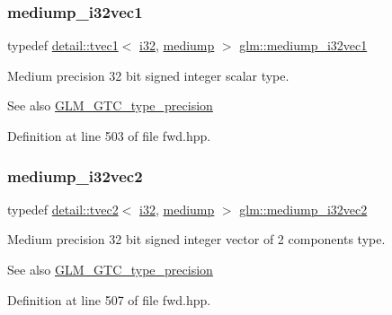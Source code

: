 \subsubsection{\texorpdfstring{mediump\+\_\+i32vec1}{mediump\_i32vec1}}
{\footnotesize\ttfamily typedef \hyperlink{structglm_1_1detail_1_1tvec1}{detail\+::tvec1}$<$ \hyperlink{group__gtc__type__precision_ga1d8ed5c43e91ea7d4528389da4fa9524}{i32}, \hyperlink{namespaceglm_a0f04f086094c747d227af4425893f545a6416f3ea0c9025fb21ed50c4d6620482}{mediump} $>$ \hyperlink{group__gtc__type__precision_ga44c6a3b78e635d91e35e1c41ab6b0ba1}{glm\+::mediump\+\_\+i32vec1}}

Medium precision 32 bit signed integer scalar type. \begin{DoxySeeAlso}{See also}
\hyperlink{group__gtc__type__precision}{G\+L\+M\+\_\+\+G\+T\+C\+\_\+type\+\_\+precision} 
\end{DoxySeeAlso}


Definition at line 503 of file fwd.\+hpp.

\mbox{\label{group__gtc__type__precision_gaef7b37956ce9e1cc4faecf21b7fdae8b}} 
\subsubsection{\texorpdfstring{mediump\+\_\+i32vec2}{mediump\_i32vec2}}
{\footnotesize\ttfamily typedef \hyperlink{structglm_1_1detail_1_1tvec2}{detail\+::tvec2}$<$ \hyperlink{group__gtc__type__precision_ga1d8ed5c43e91ea7d4528389da4fa9524}{i32}, \hyperlink{namespaceglm_a0f04f086094c747d227af4425893f545a6416f3ea0c9025fb21ed50c4d6620482}{mediump} $>$ \hyperlink{group__gtc__type__precision_gaef7b37956ce9e1cc4faecf21b7fdae8b}{glm\+::mediump\+\_\+i32vec2}}

Medium precision 32 bit signed integer vector of 2 components type. \begin{DoxySeeAlso}{See also}
\hyperlink{group__gtc__type__precision}{G\+L\+M\+\_\+\+G\+T\+C\+\_\+type\+\_\+precision} 
\end{DoxySeeAlso}


Definition at line 507 of file fwd.\+hpp.

\mbox{\label{group__gtc__type__precision_ga768e62b66086bd85a438341eedfad651}} 
